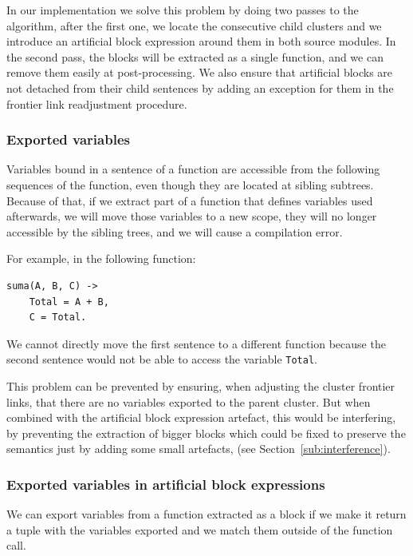 In our implementation we solve this problem by doing two passes to
the algorithm, after the first one, we locate the consecutive child
clusters and we introduce an artificial block expression around them
in both source modules. In the second pass, the blocks will be extracted
as a single function, and we can remove them easily at post-processing.
We also ensure that artificial blocks are not detached from their
child sentences by adding an exception for them in the frontier link 
readjustment
procedure.


\subsubsection{Exported variables}

Variables bound in a sentence of a function are accessible from the
following sequences of the function, even though they are located
at sibling subtrees. Because of that, if we extract part of a function
that defines variables used afterwards, we will move those variables
to a new scope, they will no longer accessible by the sibling trees,
and we will cause a compilation error.

For example, in the following function:

\begin{verbatim}
suma(A, B, C) ->
    Total = A + B,
    C = Total.
\end{verbatim}

We cannot directly move the first sentence to a different function
because the second sentence would not be able to access the variable
\texttt{Total}.

This problem can be prevented by ensuring, when adjusting the cluster
frontier links, that there are no variables exported to the parent cluster.
But when combined with the artificial block expression artefact, this
would be interfering, by preventing the extraction of bigger blocks
which could be fixed to preserve the semantics just by adding some
small artefacts, (see Section~\ref{sub:interference}).


\subsubsection{Exported variables in artificial block 
expressions\label{sub:interference}}

We can export variables from a function extracted as a block if we
make it return a tuple with the variables exported and we match them
outside of the function call.

